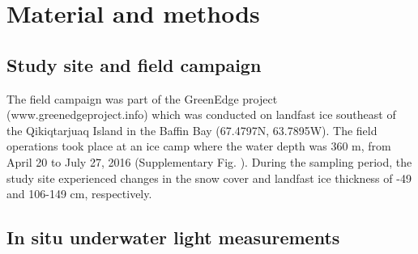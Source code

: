 \section{Material and methods}

\subsection{Study site and field campaign}

The field campaign was part of the GreenEdge project (www.greenedgeproject.info) which was conducted on landfast ice southeast of the Qikiqtarjuaq Island in the Baffin Bay (67.4797N, 63.7895W). The field operations took place at an ice camp where the water depth was 360 m, from April 20 to July 27, 2016 (Supplementary Fig. \DIFdelbegin {}\DIFdelend \DIFaddbegin {}\DIFaddend ). During the sampling period, the study site experienced changes in the snow cover and landfast ice thickness of \DIFdelbegin {}-49 \DIFaddbegin {}\DIFaddend and 106-149 cm, respectively.

\subsection{In situ underwater light measurements}

